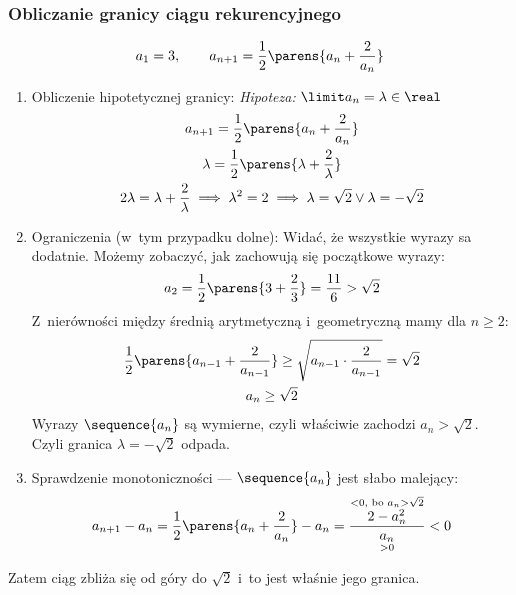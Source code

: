 \subsubsection*{Obliczanie granicy ciągu rekurencyjnego}
\begin{equation*}
    a_1 = 3,\qquad a_{n+1} = \frac{1}{2}\parens{a_n + \frac{2}{a_n}}
\end{equation*}
\begin{enumerate}[label={\arabic*\degree}]
    \item Obliczenie hipotetycznej granicy: \textit{Hipoteza:} \(\limit a_n = \lambda \in \real\)
        \begin{gather*}
            a_{n+1} = \frac{1}{2}\parens{a_n + \frac{2}{a_n}}\\
            \lambda = \frac{1}{2}\parens{\lambda + \frac{2}{\lambda}}\\
            2\lambda = \lambda + \frac{2}{\lambda} \implies \lambda^2 = 2 \implies \lambda = \sqrt{2} \lor \lambda = -\sqrt{2}
        \end{gather*}
    \item Ograniczenia (w~tym przypadku dolne): Widać, że wszystkie wyrazy sa dodatnie. Możemy zobaczyć, jak zachowują się początkowe wyrazy:
        \begin{equation*}
            a_2 = \frac{1}{2}\parens{3 + \frac{2}{3}} = \frac{11}{6} > \sqrt{2}
        \end{equation*}
        Z~nierówności między średnią arytmetyczną i~geometryczną mamy dla \(n \geq 2\):
        \begin{gather*}
            \frac{1}{2}\parens{a_{n-1} + \frac{2}{a_{n-1}}} \geq \sqrt{a_{n-1} \cdot \frac{2}{a_{n-1}}} = \sqrt{2}\\
            a_n \geq \sqrt{2}
        \end{gather*}
        Wyrazy \(\sequence{a_n}\) są wymierne, czyli właściwie zachodzi \(a_n > \sqrt{2}\). Czyli granica \(\lambda = -\sqrt{2}\) odpada.
    \item Sprawdzenie monotoniczności --- \(\sequence{a_n}\) jest słabo malejący:
        \begin{equation*}
            a_{n+1} - a_n = \frac{1}{2}\parens{a_n + \frac{2}{a_n}} - a_n = \frac{\overset{< 0, \text{ bo } a_n > \sqrt{2}}{2 - a_n^2}}{\underset{> 0}{a_n}} < 0
        \end{equation*}
\end{enumerate}
Zatem ciąg zbliża się od góry do \(\sqrt{2}\) i~to jest właśnie jego granica.
